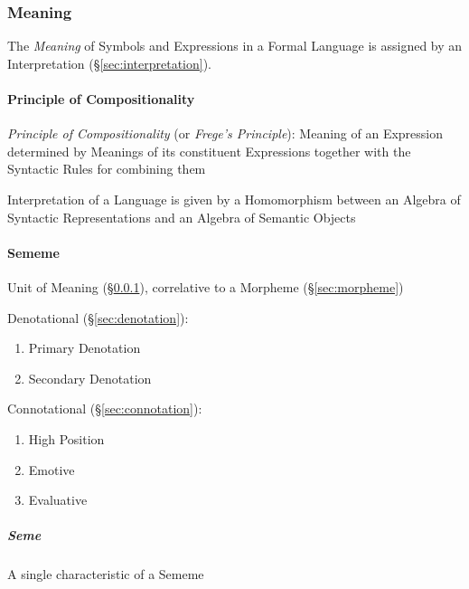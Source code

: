 \subsubsection{Meaning}\label{sec:meaning}

The \emph{Meaning} of Symbols and Expressions in a Formal Language is
assigned by an Interpretation (\S\ref{sec:interpretation}).



\paragraph{Principle of Compositionality}\label{sec:compositionality}
\hfill

\emph{Principle of Compositionality} (or \emph{Frege's Principle}):
Meaning of an Expression determined by Meanings of its constituent
Expressions together with the Syntactic Rules for combining them

Interpretation of a Language is given by a Homomorphism between an
Algebra of Syntactic Representations and an Algebra of Semantic
Objects



\paragraph{Sememe}\label{sec:sememe}\hfill

Unit of Meaning (\S\ref{sec:meaning}), correlative to a Morpheme
(\S\ref{sec:morpheme})

Denotational (\S\ref{sec:denotation}):

\begin{enumerate}
  \item Primary Denotation
  \item Secondary Denotation
\end{enumerate}

Connotational (\S\ref{sec:connotation}):

\begin{enumerate}
  \item High Position
  \item Emotive
  \item Evaluative
\end{enumerate}



\subparagraph{Seme}\label{sec:seme}\hfill

A single characteristic of a Sememe




